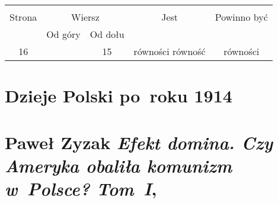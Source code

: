 \documentclass[a4paper,11pt]{article}
\numberwithin{equation}{section}
\begin{document}


\begin{center}

  \begin{tabular}{|c|c|c|c|c|}
    \hline
    & \multicolumn{2}{c|}{} & & \\
    Strona & \multicolumn{2}{c|}{Wiersz} & Jest
                              & Powinno być \\ \cline{2-3}
    & Od góry & Od dołu & & \\
    \hline
    16 & & 15 & równości równość & równości \\
    \hline
  \end{tabular}

\end{center}

\VerSpaceTwo










\newpage
\section{Dzieje Polski po~roku 1914}




\section{Paweł Zyzak \textit{Efekt domina. Czy Ameryka
    obaliła komunizm w~Polsce? Tom~I},
  \cite{ZyzakEfektDominaVolI2016} }


\end{document}
